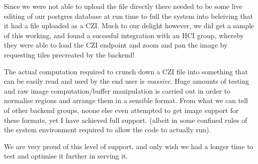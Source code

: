 Since we were not able to upload the file directly there needed to be some live editing of our postgres database at run time to full the system
into beleiving that it had a file uploaded as a CZI. Much to our delight however, we did get a sample of this working, and found a sucessful
integration with an HCI group, whereby they were able to load the CZI endpoint and zoom and pan the image by requesting tiles precreated by the backend!

The actual computation required to crunch down a CZI file into something that can be easily read and used by the end user is \emph{massive}. Huge amounts
of testing and raw image computation/buffer manipulation is carried out in order to normalise regions and arrange them in a sensible format.
From what we can tell of other backend groups, noone else even attempted to get image support for these formats, yet I have achieved full support.
(albeit in some confined rules of the system environment required to allow the code to actually run).

We are very proud of this level of support, and only wish we had a longer time to test and optimise it further in serving it.
